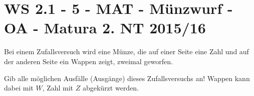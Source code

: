 \section{WS 2.1 - 5 - MAT - Münzwurf - OA - Matura 2. NT 2015/16}

\begin{beispiel}{1} %
Bei einem Zufallsversuch wird eine Münze, die auf einer Seite eine Zahl und auf der anderen Seite ein Wappen zeigt, zweimal geworfen. \leer

Gib alle möglichen Ausfälle (Ausgänge) dieses Zufallsversuchs an! Wappen kann dabei mit
$W$, Zahl mit $Z$ abgekürzt werden.\leer

\end{beispiel}